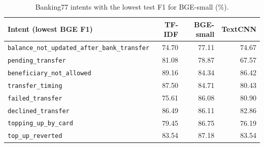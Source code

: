 \begin{table}[H]
\centering
\footnotesize
\caption{Banking77 intents with the lowest test F1 for BGE-small (\%).}\label{tab:worst}
\begin{tabular}{@{}lrrr@{}}
\toprule
Intent (lowest BGE F1) & TF-IDF & BGE-small & TextCNN \\
\midrule
\texttt{balance\_not\_updated\_after\_bank\_transfer} & 74.70 & 77.11 & 74.67 \\
\texttt{pending\_transfer} & 81.08 & 78.87 & 67.57 \\
\texttt{beneficiary\_not\_allowed} & 89.16 & 84.34 & 86.42 \\
\texttt{transfer\_timing} & 87.50 & 84.71 & 80.43 \\
\texttt{failed\_transfer} & 75.61 & 86.08 & 80.90 \\
\texttt{declined\_transfer} & 86.49 & 86.11 & 82.86 \\
\texttt{topping\_up\_by\_card} & 79.45 & 86.75 & 76.19 \\
\texttt{top\_up\_reverted} & 83.54 & 87.18 & 83.54 \\
\bottomrule
\end{tabular}
\end{table}
